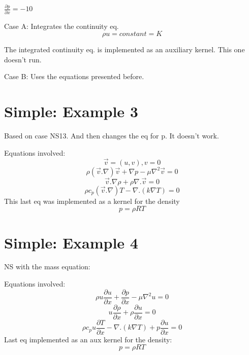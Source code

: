 \documentclass[11pt,letterpaper]{article}
\begin{document}
$\frac{\partial p}{\partial x}=-10$

Case A:
Integrates the continuity eq.
\begin{equation}
\rho u = constant = K
\end{equation}

The integrated continuity eq. is implemented as an auxiliary kernel.
This one doesn't run.

Case B:
Uses the equations presented before.

\section{Simple: Example 3}

Based on case NS13. And then changes the eq for p.
It doesn't work.

Equations involved:
\begin{equation}
\vec{v}=(u,v), v = 0
\end{equation}
\begin{equation}
\rho (\vec{v}.\nabla)\vec{v} + \nabla p - \mu \nabla^{2}\vec{v} = 0
\end{equation}
\begin{equation}
\vec{v}.\nabla \rho + \rho \nabla.\vec{v}=0
\end{equation}
\begin{equation}
\rho c_{p} (\vec{v}.\nabla)T - \nabla .(k\nabla T) = 0
\end{equation}
This last eq was implemented as a kernel for the density
\begin{equation}
p = \rho R T
\end{equation}

\section{Simple: Example 4}

NS with the mass equation:

Equations involved:
\begin{equation}
\rho u\frac{\partial u}{\partial x} + \frac{\partial p}{\partial x} - \mu \nabla^{2}u = 0
\end{equation}
\begin{equation}
u \frac{\partial \rho}{\partial x} + \rho \frac{\partial u}{\partial x}=0
\end{equation}
\begin{equation}
\rho c_{p} u \frac{\partial T}{\partial x} - \nabla .(k\nabla T) + p \frac{\partial u}{\partial x} = 0
\end{equation}
Last eq implemented as an aux kernel for the density:
\begin{equation}
p = \rho R T
\end{equation}
\end{document}
